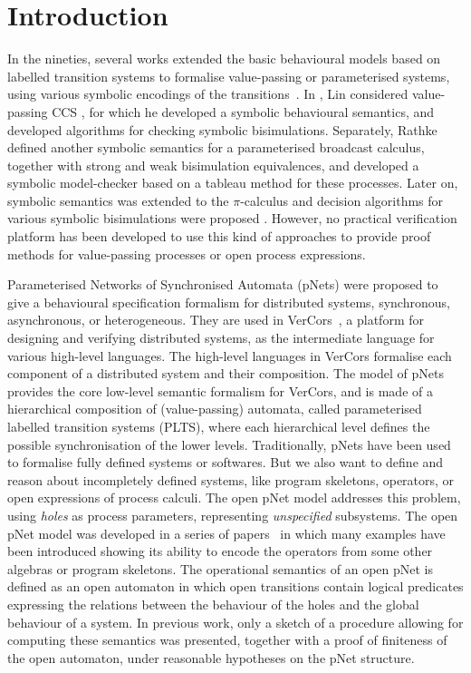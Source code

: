\documentclass[smallcondensed]{svjour3}
\begin{document}
\section{Introduction}
In the nineties, several 
works extended the basic behavioural models based on labelled
transition systems to formalise value-passing or parameterised systems, using
various symbolic encodings of the
transitions~\cite{deSimone85,Larsen87,HennessyLin:TCS95,Linconcur96}. 
In \cite{Linconcur96}, Lin considered value-passing CCS \cite{Milner89}, for which he
developed a symbolic behavioural semantics, and developed algorithms for checking symbolic bisimulations.
Separately, Rathke~\cite{HennessyRathke:TCS98} defined another
symbolic semantics for 
a parameterised broadcast calculus, together with strong and weak bisimulation
equivalences, and developed a symbolic model-checker based on a tableau
method for these processes. 
Later on, symbolic semantics was extended to the $\pi$-calculus \cite{Milner99} and decision algorithms for various symbolic bisimulations were proposed \cite{Li99,Deng2001}. However, no
practical verification platform has been developed to use this kind of approaches to provide proof methods for
value-passing processes or open process expressions. 

Parameterised Networks of Synchronised Automata (pNets) were proposed
to give a behavioural specification formalism for distributed
systems, synchronous, asynchronous, or heterogeneous. They are used in
VerCors~\cite{HKLM:Foclasa14}, a platform for designing and 
verifying distributed systems, as the intermediate language for various
high-level languages. The high-level languages in VerCors formalise
each component of a distributed system and their composition. The model of
pNets provides the core low-level semantic formalism for VerCors, and
is made of a hierarchical composition of (value-passing) automata,
called parameterised labelled transition systems (PLTS), where each
hierarchical level defines the possible synchronisation of the lower levels.
Traditionally, pNets have been used to formalise fully
defined systems or softwares. But we  also want to define and reason
about incompletely defined systems, like program skeletons, operators,
or open expressions of process calculi.
The open pNet model addresses this problem, using
\emph{holes} as process parameters, representing \emph{unspecified} subsystems.
The open pNet model was developed in a series of
papers~\cite{HMZ:PDP15,henrio:Forte2016} in which many examples have been
introduced showing its ability to encode the operators from some
other algebras or  program skeletons.
The operational semantics of an open pNet is defined as an
open automaton in which open transitions contain logical predicates
expressing the relations between the behaviour of the holes and the
global behaviour of a system. In previous work,
only a sketch of a procedure allowing for computing these semantics was
presented, together with a proof of finiteness of the open automaton, under
reasonable hypotheses on the pNet structure.
\end{document}
